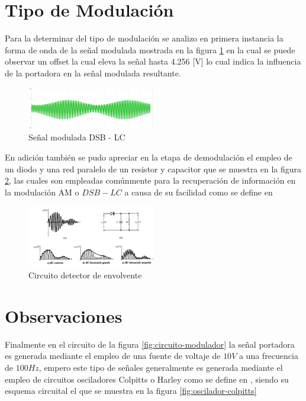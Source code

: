 \documentclass[conference]{IEEEtran}
\begin{document}
	
	\section{Tipo de Modulación}
	
	Para la determinar del tipo de modulación se analizo en primera instancia la forma de onda de la señal modulada mostrada en la figura \ref{fig:senial-modulada} en la cual se puede observar un offset la cual eleva la señal hasta 4.256 [V] lo cual indica la influencia de la portadora en la señal modulada resultante.
	
	\begin{figure}[h]
		\centering
		\includegraphics[width=0.5\textwidth]{media/senial-modulada}
		\caption{Señal modulada DSB - LC}
		\label{fig:senial-modulada}
	\end{figure}
	
	En adición también se pudo apreciar en la etapa de demodulación el empleo de un diodo y una red paralelo de un resistor y capacitor que se muestra en la figura \ref{fig:detector-envolvente}, las cuales son empleadas comúnmente para la recuperación de información en la modulación AM o $DSB - LC$ a causa de su facilidad como se define en \cite{stremler2006}
	
	\begin{figure}[h]
		\centering
		\includegraphics[width=0.5\textwidth]{media/detector-envolvente}
		\caption{Circuito detector de envolvente}
		\label{fig:detector-envolvente}
	\end{figure}
	
	
	\section{Observaciones}
	
	Finalmente en el circuito de la figura \ref{fig:circuito-modulador} la señal portadora es generada mediante el empleo de una fuente de voltaje de $10 V$ a una frecuencia de $100 Hz$, empero este tipo de señales generalmente es generada mediante el empleo de circuitos osciladores Colpitts o Harley como se define en \cite{tomasi_comunicaciones}, siendo su esquema circuital el que se muestra en la figura \ref{fig:oscilador-colpitts}
	
\end{document}
